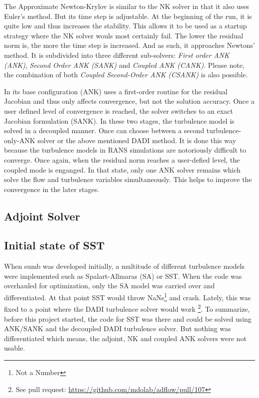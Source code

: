 The Approximate Newton-Krylov is similar to the NK solver in that it also uses
Euler's method. But its time step is adjustable. At the beginning of the run,
it is quite low and thus increases the stability. This allows it to be used
as a startup strategy where the NK solver wouls most certainly fail. The
lower the residual norm is, the more the time step is increased. And as such, it
approaches Newtons' method. It is subdivided into three different sub-solvers:
\textit{First order ANK (ANK)}, \textit{Second Order ANK (SANK)} and
\textit{Coupled ANK (CANK)}. Please note, the combination of both
\textit{Coupled Second-Order ANK (CSANK)} is also possible.

In its base configuration (ANK) uses a first-order routine for the residual
Jacobian and thus only affects convergence, but not the solution accuracy. Once
a user defined level of convergence is reached, the solver switches to an exact
Jacobian formulation (SANK). In these two stages, the turbulence model is
solved in a decoupled manner. Once can choose between a second
turbulence-only-ANK solver or the above mentioned DADI method. It is done this
way because the turbulence models in RANS simulations are notoriously difficult
to converge. Once again, when the residual norm reaches a user-defied level,
the coupled mode is enganged. In that state, only one ANK solver remains which
solve the flow and turbulence variables simultaneously. This helps to improve
the convergence in the later stages. \cite{adflow_solvers}




\subsection{Adjoint Solver}




\subsection{Initial state of SST}
When sumb was developed initially, a multitude of different turbulence models
were implemented such as Spalart-Allmaras (SA) or SST. When the code was
overhauled for optimization, only the SA model was carried over and
differentiated. At that point SST would throw NaNs\footnote{Not a Number} and
crash. Lately, this was fixed to a point where the DADI turbulence solver would
work \footnote{See pull request:
\url{https://github.com/mdolab/adflow/pull/107}}. To summarize, before this
project started, the code for SST was there and could be solved using ANK/SANK
and the decoupled DADI turbulence solver. But nothing was differentiated which
means, the adjoint, NK and coupled ANK solvers were not usable.








